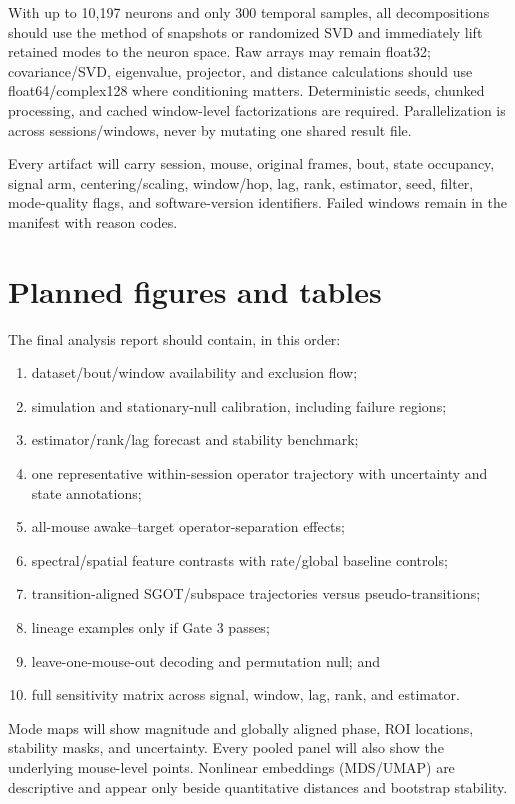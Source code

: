 \documentclass[11pt,a4paper]{article}
\begin{document}
With up to 10,197 neurons and only 300 temporal samples, all decompositions should use the method of snapshots or randomized SVD and immediately lift retained modes to the neuron space. Raw arrays may remain float32; covariance/SVD, eigenvalue, projector, and distance calculations should use float64/complex128 where conditioning matters. Deterministic seeds, chunked processing, and cached window-level factorizations are required. Parallelization is across sessions/windows, never by mutating one shared result file.

Every artifact will carry session, mouse, original frames, bout, state occupancy, signal arm, centering/scaling, window/hop, lag, rank, estimator, seed, filter, mode-quality flags, and software-version identifiers. Failed windows remain in the manifest with reason codes.

\section{Planned figures and tables}

The final analysis report should contain, in this order:

\begin{enumerate}
  \item dataset/bout/window availability and exclusion flow;
  \item simulation and stationary-null calibration, including failure regions;
  \item estimator/rank/lag forecast and stability benchmark;
  \item one representative within-session operator trajectory with uncertainty and state annotations;
  \item all-mouse awake--target operator-separation effects;
  \item spectral/spatial feature contrasts with rate/global baseline controls;
  \item transition-aligned SGOT/subspace trajectories versus pseudo-transitions;
  \item lineage examples only if Gate 3 passes;
  \item leave-one-mouse-out decoding and permutation null; and
  \item full sensitivity matrix across signal, window, lag, rank, and estimator.
\end{enumerate}

Mode maps will show magnitude and globally aligned phase, ROI locations, stability masks, and uncertainty. Every pooled panel will also show the underlying mouse-level points. Nonlinear embeddings (MDS/UMAP) are descriptive and appear only beside quantitative distances and bootstrap stability.
\end{document}
